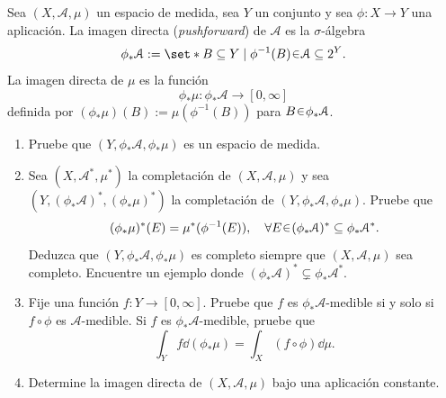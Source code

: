 \setcounter{neje}{68}
\begin{nejer}
Sea $(X, \mathcal{A}, \mu)$ un espacio de medida, sea $Y$ un conjunto y sea $\phi: X \to Y$ una aplicación. La imagen directa (\textit{pushforward}) de $\mathcal{A}$ es la $\sigma$-álgebra
$$
\phi_*\mathcal{A} := \set*{B \subseteq Y \mid \phi^{-1}(B) \en \mathcal{A}} \subseteq 2^Y.
$$
La imagen directa de $\mu$ es la función
$$
\phi_*\mu\colon \phi_*\mathcal{A} \to [0, \infty]
$$
definida por $(\phi_*\mu)(B) := \mu(\phi^{-1}(B))$ para $B \en \phi_*\mathcal{A}$.

\begin{enumerate}[label = (\roman*)]
\item Pruebe que $(Y, \phi_*\mathcal{A}, \phi_*\mu)$ es un espacio de medida.

\item Sea $(X, \mathcal{A}^*, \mu^*)$ la completación de $(X, \mathcal{A}, \mu)$ y sea $(Y, (\phi_*\mathcal{A})^*, (\phi_*\mu)^*)$ la completación de $(Y, \phi_*\mathcal{A}, \phi_*\mu)$. Pruebe que
$$
(\phi_*\mu)^*(E) = \mu^*(\phi^{-1}(E)), \quad \forall E \en (\phi_*\mathcal{A})^* \subseteq \phi_*\mathcal{A}^*.
$$
Deduzca que $(Y, \phi_*\mathcal{A}, \phi_*\mu)$ es completo siempre que $(X, \mathcal{A}, \mu)$ sea completo. Encuentre un ejemplo donde $(\phi_*\mathcal{A})^* \subsetneq \phi_*\mathcal{A}^*$.

\item Fije una función $f\colon Y \to [0, \infty]$. Pruebe que $f$ es $\phi_*\mathcal{A}$-medible si y solo si $f \circ \phi$ es $\mathcal{A}$-medible. Si $f$ es $\phi_*\mathcal{A}$-medible, pruebe que
$$
\int_Y f \dd{(\phi_*\mu)} = \int_X (f \circ \phi) \dd{\mu}.
$$

\item Determine la imagen directa de $(X, \mathcal{A}, \mu)$ bajo una aplicación constante.
\end{enumerate}
\end{nejer}
